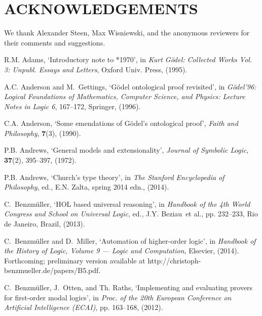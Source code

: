 \documentclass{ecai2014}
\begin{document}
{%
\section*{ACKNOWLEDGEMENTS}
 We thank Alexander Steen,
 Max Wisniewski, and the anonymous reviewers for their comments and suggestions.


%
\begin{thebibliography}{10}

R.M. Adams, `Introductory note to *1970', in {\em {Kurt G\"odel: Collected
  Works Vol. 3: Unpubl. Essays and Letters}}, Oxford Univ. Press, (1995).

A.C. Anderson and M.~Gettings, `G\"odel ontological proof revisited', in {\em
  {G\"odel'96: Logical Foundations of Mathematics, Computer Science, and
  Physics: Lecture Notes in Logic 6}},  167--172, {Springer}, (1996).

C.A. Anderson, `Some emendations of {G{\"o}del's} ontological proof', {\em
  Faith and Philosophy}, {\bf 7}(3), (1990).

P.B. Andrews, `General models and extensionality', {\em Journal of Symbolic
  Logic}, {\bf 37}(2),  395--397, (1972).

P.B. Andrews, `Church's type theory', in {\em The Stanford Encyclopedia of
  Philosophy}, ed., E.N. Zalta, spring 2014 edn., (2014).

C.~Benzm{\"u}ller, `{HOL} based universal reasoning', in {\em Handbook of the
  4th World Congress and School on Universal Logic}, ed., J.Y. Beziau~et al.,
  pp. 232--233, Rio de Janeiro, Brazil, (2013).

C.~Benzm{\"u}ller and D.~Miller, `Automation of higher-order logic', in {\em
  Handbook of the History of Logic, Volume 9 --- Logic and Computation},
  Elsevier, (2014).
\newblock Forthcoming; preliminary version available at
  {http://christoph-benzmueller.de/papers/B5.pdf}.

C.~Benzm{\"u}ller, J.~Otten, and Th. Raths, `Implementing and evaluating
  provers for first-order modal logics', in {\em Proc. of the 20th European
  Conference on Artificial Intelligence (ECAI)}, pp. 163--168, (2012).


\end{thebibliography}}
\end{document}
